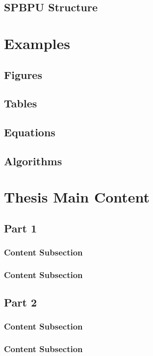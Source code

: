 \documentclass[a4paper,twoside,12pt]{book}
\begin{document}
			\section{SPBPU Structure} 
		\chapter{Examples} 
			\section{Figures} 
			\section{Tables} 
			\section{Equations} 
			\section{Algorithms} 
		\chapter{Thesis Main Content} 
			\section{Part 1}
				\subsection{Content Subsection}
				\subsection{Content Subsection}
			\section{Part 2}
				\subsection{Content Subsection}
				\subsection{Content Subsection}
\end{document}
